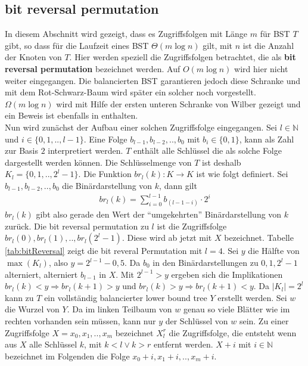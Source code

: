 \documentclass[a4paper,12pt]{article}
\begin{document}
\subsection{bit reversal permutation } \label{abschnittBitReversal}
In diesem Abschnitt wird gezeigt, dass es Zugriffsfolgen mit Länge $m$ für BST $T$ gibt, so dass für die Laufzeit eines BST $\Theta\left(m \log n\right)$ gilt, mit $n$ ist die Anzahl der Knoten von $T$. Hier werden speziell die Zugriffsfolgen betrachtet, die als \textbf{bit reversal permutation} bezeichnet werden. Auf $O\left(m \log n\right)$ wird hier nicht weiter eingegangen. Die balancierten BST garantieren jedoch diese Schranke und mit dem Rot-Schwarz-Baum wird später ein solcher noch vorgestellt.
 $\Omega\left(m \log n\right)$  wird mit Hilfe der ersten unteren Schranke von Wilber gezeigt und ein Beweis ist ebenfalls in \cite{wilberLowerBounds} enthalten. \\
  Nun wird zunächst der Aufbau einer solchen Zugriffsfolge eingegangen. Sei $l \in \mathbb{N}$ und $i \in \{0,1,..,l-1\}$. Eine Folge  $b_{l-1},b_{l-2},..,b_0$ mit $b_i \in \{0,1\}$, kann als Zahl zur Basis $2$ interpretiert werden. $T$ enthält alle Schlüssel die als solche Folge dargestellt werden können. Die Schlüsselmenge von $T$ ist deshalb $K_l = \{0,1,..,2^l -1\}$. 
  Die Funktion $\mathit{br}_l(k)\colon K \rightarrow K$ ist wie folgt definiert. Sei {$b_{l-1},b_{l-2},..,b_{0}$} die Binärdarstellung von $k$, dann gilt 
\begin{align*}
\mathit{br}_l(k) = \sum_{i = 0}^{l-1} b_{\left(l-1-i\right)} \cdot 2^i
\end{align*}
 $\mathit{br}_l(k)$ gibt also gerade den Wert der \enquote{umgekehrten} Binärdarstellung von $k$ zurück. Die bit reversal permutation zu $l$ ist die Zugriffsfolge\\ ${\mathit{br}_l(0),\mathit{br}_l(1),..,\mathit{br}_l(2^l-1)}$. Diese wird ab jetzt mit $X$ bezeichnet. Tabelle \ref{tab:bitReversal} zeigt die bit reveral Permutation mit $l  = 4$. Sei $y$ die Hälfte von $\max\left(K_l\right)$, also $y = 2^{l-1} - 0,5$. Da $b_0$ in den Binärdarstellungen zu $0, 1, 2^l-1$ alterniert, alterniert $b_{l-1}$ in $X$. Mit $2^{l-1} > y$ ergeben sich die Implikationen $\mathit{br}_l(k) < y \Rightarrow \mathit{br}_l(k +1) > y$ und $\mathit{br}_l(k) > y \Rightarrow \mathit{br}_l(k +1) < y$. Da $\vert K_l \vert = 2^l$ kann zu $T$ ein vollständig balancierter lower bound tree $Y$ erstellt werden. Sei $w$ die Wurzel von $Y$. Da im linken Teilbaum von $w$ genau so viele Blätter wie im rechten vorhanden sein müssen, kann nur $y$ der Schlüssel von $w$ sein. Zu einer Zugriffsfolge $X = x_0,x_1,..,x_m$ bezeichnet $X^r_l$ die Zugriffsfolge, die entsteht wenn aus $X$ alle Schlüssel $k$, mit $k < l \lor k > r$ entfernt werden. $X + i$ mit $i \in \mathbb{N}$ bezeichnet im Folgenden die Folge $x_0 + i, x_1 + i,.., x_m + i$.\\
 
\end{document}

